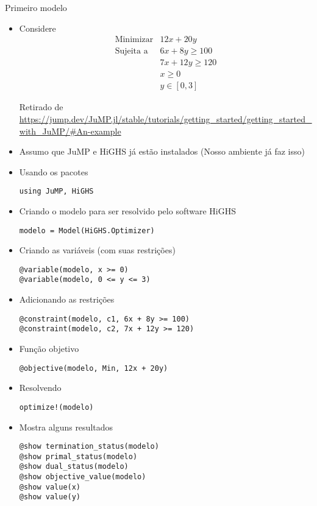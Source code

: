 \documentclass[10pt]{beamer}
\begin{document}
\begin{frame}[fragile]{Primeiro modelo}

  \begin{itemize}
  \item<only@1> Considere
  \[
    \begin{array}{ll}
      \mbox{Minimizar} & 12 x + 20 y \\
      \mbox{Sujeita a} & 6x + 8y \ge 100 \\
                       & 7x + 12y \ge 120 \\
                       & x \ge 0 \\
                       & y \in [0, 3]
    \end{array}
  \]
  
  Retirado de {\scriptsize
    \url{https://jump.dev/JuMP.jl/stable/tutorials/getting_started/getting_started_with_JuMP/#An-example}}
    
  \item<only@2> Assumo que JuMP e HiGHS já estão instalados (Nosso ambiente já faz isso)

  \item<only@3> Usando os pacotes
\begin{verbatim}
using JuMP, HiGHS
\end{verbatim}

  \item<only@4> Criando o modelo para ser resolvido pelo software HiGHS
\begin{verbatim}
modelo = Model(HiGHS.Optimizer)
\end{verbatim}

  \item<only@5> Criando as variáveis (com suas restrições)
\begin{verbatim}
@variable(modelo, x >= 0)
@variable(modelo, 0 <= y <= 3)
\end{verbatim}

  \item<only@6> Adicionando as restrições
\begin{verbatim}
@constraint(modelo, c1, 6x + 8y >= 100)
@constraint(modelo, c2, 7x + 12y >= 120)
\end{verbatim}

  \item<only@7> Função objetivo
\begin{verbatim}
@objective(modelo, Min, 12x + 20y)
\end{verbatim}

  \item<only@8> Resolvendo
\begin{verbatim}
optimize!(modelo)
\end{verbatim}

  \item<only@9> Mostra alguns resultados
\begin{verbatim}
@show termination_status(modelo)
@show primal_status(modelo)
@show dual_status(modelo)
@show objective_value(modelo)
@show value(x)
@show value(y)
\end{verbatim}
    
  \end{itemize}
  
\end{frame}
\end{document}
